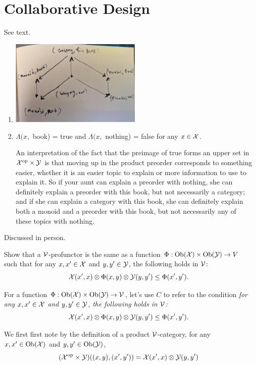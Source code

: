 \chapter{Collaborative Design}

See text.

\solution
\begin{enumerate}
	\item \includegraphics[width=0.5\textwidth]{images/4-4.jpg}
	\item $\Lambda(x,$ book) = true  and $\Lambda(x,$ nothing) = false for any $x\in\mathcal{X}$.
	
	  An interpretation of the fact that the preimage of true forms an upper set in $\mathcal{X}^{\textrm{op}}\times\mathcal{Y}$ is that moving up in the product preorder corresponds to something easier, whether it is an easier topic to explain or more information to use to explain it.  So if your aunt can explain a preorder with nothing, she can definitely explain a preorder with this book, but not necessarily a category; and if she can explain a category with this book, she can definitely explain both a monoid and a preorder with this book, but not necessarily any of these topics with nothing.
\end{enumerate}

Discussed in person.

Show that a $\mathcal{V}$-profunctor is the same as a function $\Phi:\textrm{Ob}(\mathcal{X})\times\textrm{Ob}(\mathcal{Y})\to V$ such that for any $x,x'\in\mathcal{X}$ and $y,y'\in\mathcal{Y}$, the following holds in $\mathcal{V}$:
$$\mathcal{X}(x',x)\otimes\Phi(x,y)\otimes\mathcal{Y}(y,y')\leq\Phi(x',y').$$

\solution
For a function $\Phi:\textrm{Ob}(\mathcal{X})\times\textrm{Ob}(\mathcal{Y})\to \mathcal{V}$, let's use $C$ to refer to the condition \textit{for any $x,x'\in\mathcal{X}$ and $y,y'\in\mathcal{Y}$, the following holds in $\mathcal{V}$:}
$$\mathcal{X}(x',x)\otimes\Phi(x,y)\otimes\mathcal{Y}(y,y')\leq\Phi(x',y').$$

We first first note by the definition of a product $\mathcal{V}$-category, for any $x,x'\in\textrm{Ob}(\mathcal{X})$ and $y,y'\in\textrm{Ob}(\mathcal{Y})$,
$$(\mathcal{X}^{\textrm{op}}\times\mathcal{Y})((x,y),(x',y'))=\mathcal{X}(x',x)\otimes\mathcal{Y}(y,y')$$

